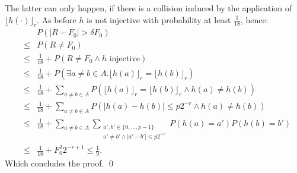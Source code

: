 \documentclass[11pt,a4paper]{article}
\newcommand{\size}[1]{\lvert#1\rvert}
\begin{document}
The latter can only happen, if there is a collision induced by the application of $\lfloor h(\cdot)\rfloor_r$. As before $h$ is not injective with probability at least $\frac{1}{18}$, hence:
\begin{eqnarray*}
    & & P\left( \size{R - F_0} > \delta F_0\right) \\
    & \leq & P\left( R \neq F_0 \right) \\
    & \leq & \frac{1}{18} + P\left( R \neq F_0 \wedge h \textrm{ injective} \right) \\
    & \leq & \frac{1}{18} + P\left( \exists a \neq b \in A. \lfloor h(a) \rfloor_r = \lfloor h(b) \rfloor_r  \right) \\
    & \leq & \frac{1}{18} + \sum_{a \neq b \in A} P\left(\lfloor h(a) \rfloor_r = \lfloor h(b) \rfloor_r \wedge h(a) \neq h(b) \right) \\
    & \leq & \frac{1}{18} + \sum_{a \neq b \in A} P\left(\size{h(a) - h(b)} \leq p 2^{-r} \wedge h(a) \neq h(b) \right) \\
    & \leq & \frac{1}{18} + \sum_{a \neq b \in A} \sum_{\substack{a', b' \in \{0,\ldots, p-1\} \\  a' \neq b' \wedge \size{a'-b'} \leq p 2^{-r}}} P(h(a) = a') P(h(b)= b') \\
    & \leq & \frac{1}{18} + F_0^2 2^{-r+1} \leq \frac{1}{9} \textrm{.}
\end{eqnarray*}
Which concludes the proof. \qed


\end{document}
